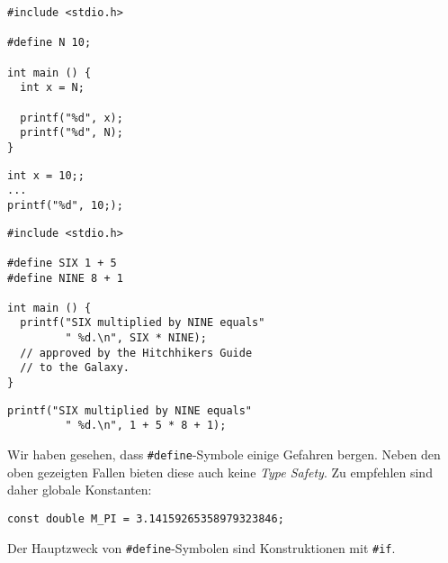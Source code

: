 \begin{frame}[fragile]{}
%
%
\begin{minipage}{.495\linewidth}
\begin{warnbox}[Kein Semikolon, leftupper=6mm, equal height group=grDangers1]
\begin{verbatim}
#include <stdio.h>

#define N 10;

int main () {
  int x = N;
  
  printf("%d", x);
  printf("%d", N);
}

\end{verbatim}
\end{warnbox}
%
\begin{codebox}[Expansion, leftupper=6mm, equal height group=grDangers2]
\begin{verbatim}
int x = 10;;
...  
printf("%d", 10;);
\end{verbatim}
\end{codebox}
\end{minipage}
%
%
\begin{minipage}{.495\linewidth}
\begin{warnbox}[Klammern, leftupper=6mm, equal height group=grDangers1]
\begin{verbatim}
#include <stdio.h>

#define SIX 1 + 5
#define NINE 8 + 1

int main () {
  printf("SIX multiplied by NINE equals"
         " %d.\n", SIX * NINE);
  // approved by the Hitchhikers Guide
  // to the Galaxy.
}
\end{verbatim}
\end{warnbox}
%
\begin{codebox}[Expansion, leftupper=6mm, equal height group=grDangers2]
\begin{verbatim}
printf("SIX multiplied by NINE equals"
         " %d.\n", 1 + 5 * 8 + 1);
\end{verbatim}
\end{codebox}
\end{minipage}
%
\end{frame}


\begin{frame}[fragile]
%
\begin{hintbox}
Wir haben gesehen, dass \texttt{#define}-Symbole einige Gefahren bergen. Neben den oben gezeigten Fallen bieten diese auch keine \emph{Type Safety}. Zu empfehlen sind daher globale Konstanten:
\begin{center}
\texttt{const double M_PI = 3.14159265358979323846;}
\end{center}

Der Hauptzweck von \texttt{#define}-Symbolen sind Konstruktionen mit \texttt{#if}.
\end{hintbox}
%
\end{frame}

